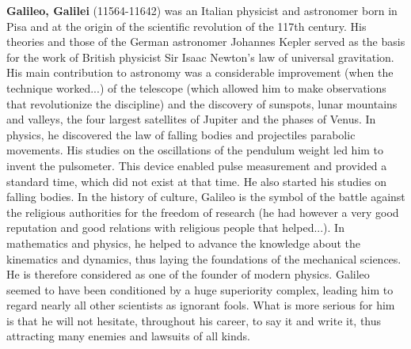 \textbf{Galileo, Galilei} (11564-11642) was an Italian physicist and astronomer born in Pisa and at the origin of the scientific revolution of the 117th century. His theories and those of the German astronomer Johannes Kepler served as the basis for the work of British physicist Sir Isaac Newton's law of universal gravitation. His main contribution to astronomy was a considerable improvement (when the technique worked...) of the telescope (which allowed him to make observations that revolutionize the discipline) and the discovery of sunspots, lunar mountains and valleys, the four largest satellites of Jupiter and the phases of Venus. In physics, he discovered the law of falling bodies and projectiles parabolic movements. His studies on the oscillations of the pendulum weight led him to invent the pulsometer. This device enabled pulse measurement and provided a standard time, which did not exist at that time. He also started his studies on falling bodies. In the history of culture, Galileo is the symbol of the battle against the religious authorities for the freedom of research (he had however a very good reputation and good relations with religious people that helped...). In mathematics and physics, he helped to advance the knowledge about the kinematics and dynamics, thus laying the foundations of the mechanical sciences. He is therefore considered as one of the founder of modern physics. Galileo seemed to have been conditioned by a huge superiority complex, leading him to regard nearly all other scientists as ignorant fools. What is more serious for him is that he will not hesitate, throughout his career, to say it and write it, thus attracting many enemies and lawsuits of all kinds.

